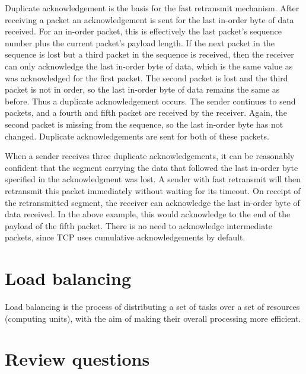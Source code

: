 Duplicate acknowledgement is the basis for the fast retransmit mechanism.
After receiving a packet an acknowledgement is sent for the last in-order byte of data received.
For an in-order packet, this is effectively the last packet's sequence number plus the current packet's payload length.
If the next packet in the sequence is lost but a third packet in the sequence is received, then the receiver can only acknowledge the last in-order byte of data, which is the same value as was acknowledged for the first packet.
The second packet is lost and the third packet is not in order, so the last in-order byte of data remains the same as before.
Thus a duplicate acknowledgement occurs.
The sender continues to send packets, and a fourth and fifth packet are received by the receiver.
Again, the second packet is missing from the sequence, so the last in-order byte has not changed.
Duplicate acknowledgements are sent for both of these packets.

When a sender receives three duplicate acknowledgements, it can be reasonably confident that the segment carrying the data that followed the last in-order byte specified in the acknowledgment was lost. 
A sender with fast retransmit will then retransmit this packet immediately without waiting for its timeout.
On receipt of the retransmitted segment, the receiver can acknowledge the last in-order byte of data received.
In the above example, this would acknowledge to the end of the payload of the fifth packet.
There is no need to acknowledge intermediate packets, since \acs{TCP} uses cumulative acknowledgements by default.




\section{Load balancing}
Load balancing is the process of distributing a set of tasks over a set of resources (computing units), with the aim of making their overall processing more efficient.


\section{Review questions}
\label{sec:transport-review-qu}


